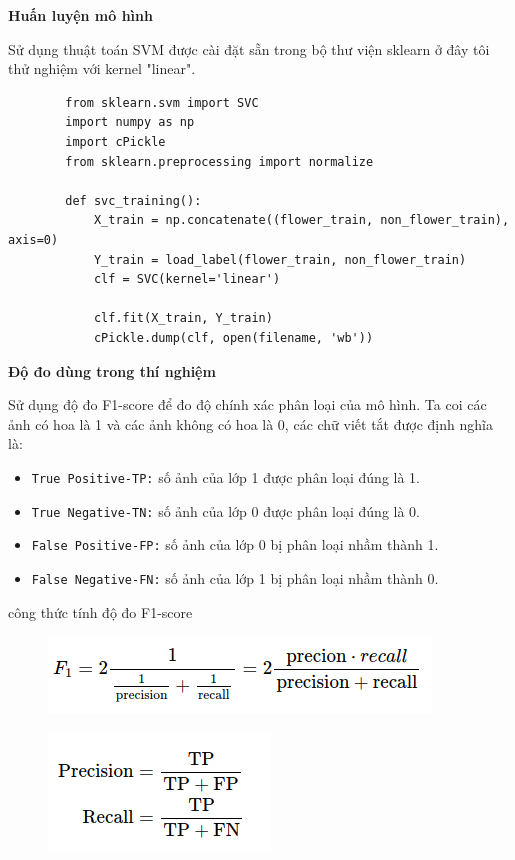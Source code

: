 \documentclass[12pt]{report}
\begin{document}
		\textbf{Huấn luyện mô hình}
		
		Sử dụng thuật toán SVM được cài đặt sẵn trong bộ thư viện sklearn ở đây tôi thử nghiệm với kernel "linear".

		\begin{lstlisting}
		from sklearn.svm import SVC
		import numpy as np
		import cPickle
		from sklearn.preprocessing import normalize

		def svc_training():
			X_train = np.concatenate((flower_train, non_flower_train), axis=0)
			Y_train = load_label(flower_train, non_flower_train)
			clf = SVC(kernel='linear')

			clf.fit(X_train, Y_train)
			cPickle.dump(clf, open(filename, 'wb'))
		\end{lstlisting}


		\textbf{Độ đo dùng trong thí nghiệm}
		
		Sử dụng độ đo F1-score \cite{cia_f1_score} để đo độ chính xác phân loại của mô hình.
		Ta coi các ảnh có hoa là 1 và các ảnh không có hoa là 0, các chữ viết tắt được định nghĩa là: 
		\begin{itemize}
			\item \texttt{True Positive-TP:} số ảnh của lớp 1 được phân loại đúng là 1.
			\item \texttt{True Negative-TN:} số ảnh của lớp 0 được phân loại đúng là 0.
			\item \texttt{False Positive-FP:} số ảnh của lớp 0 bị phân loại nhầm thành 1.
			\item \texttt{False Negative-FN:} số ảnh của lớp 1 bị phân loại nhầm thành 0.
		\end{itemize}

		công thức tính độ đo F1-score \cite{cia_f1_score}	
		\begin{figure}[h]
			\centering
			\includegraphics[scale=1]{f1score}
		\end{figure}
		
		\begin{figure}[h]
			\centering
			\includegraphics[scale=1]{percision}
		\end{figure}
		
\end{document}
